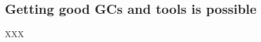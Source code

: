 \documentclass{llncs}
\begin{document}
\subsection{Getting good GCs and tools is possible}

XXX 


\end{document}
